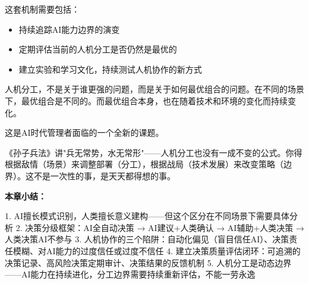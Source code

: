 这套机制需要包括：
\begin{itemize}
\item 持续追踪AI能力边界的演变
\item 定期评估当前的人机分工是否仍然是最优的
\item 建立实验和学习文化，持续测试人机协作的新方式

\end{itemize}
人机分工，不是关于谁更强的问题，而是关于如何最优组合的问题。在不同的场景下，最优组合是不同的。而最优组合本身，也在随着技术和环境的变化而持续变化。

这是AI时代管理者面临的一个全新的课题。

《孙子兵法》讲"兵无常势，水无常形"——人机分工也没有一成不变的公式。你得根据敌情（场景）来调整部署（分工），根据战局（技术发展）来改变策略（边界）。这不是一次性的事，是天天都得想的事。


\textbf{本章小结：}

1. AI擅长模式识别，人类擅长意义建构——但这个区分在不同场景下需要具体分析
2. 决策分级框架：AI全自动决策 → AI建议+人类确认 → AI辅助+人类决策 → 人类决策AI不参与
3. 人机协作的三个陷阱：自动化偏见（盲目信任AI）、决策责任模糊、对AI能力的过度信任或过度不信任
4. 建立决策质量评估闭环：可追溯的决策记录、高风险决策定期审计、决策结果的反馈机制
5. 人机分工是动态边界——AI能力在持续进化，分工边界需要持续重新评估，不能一劳永逸
